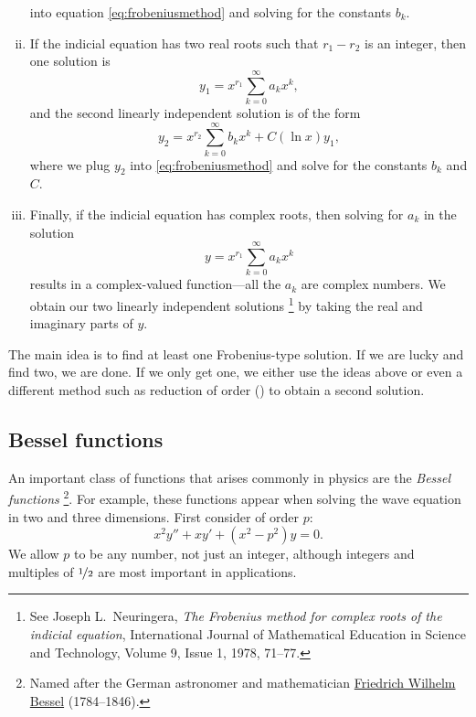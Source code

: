 \begin{enumerate}[(i)]
\begin{equation*}
\end{equation*}
into equation \eqref{eq:frobeniusmethod} and solving for the constants $b_k$.
\item
If the indicial equation has two real roots such that $r_1-r_2$ is
an integer, then one solution is
\begin{equation*}
y_1 = x^{r_1} \sum_{k=0}^\infty a_k x^{k} ,
\end{equation*}
and the second linearly independent solution is of the form
\begin{equation*}
y_2 = x^{r_2} \sum_{k=0}^\infty b_k x^{k} + C (\ln x) y_1 ,
\end{equation*}
where we plug $y_2$ into \eqref{eq:frobeniusmethod} and solve for the
constants $b_k$ and $C$.
\item
Finally, if the indicial equation has complex roots, then solving
for $a_k$ in the solution
\begin{equation*}
y = x^{r_1} \sum_{k=0}^\infty a_k x^{k}
\end{equation*}
results in a complex-valued function---all the $a_k$ are complex
numbers.  We obtain our two linearly independent
solutions%
\footnote{See 
Joseph L.\ Neuringera,
\emph{The Frobenius method for complex roots of the indicial equation},
International Journal of Mathematical Education in Science and Technology,
Volume 9, Issue 1, 1978, 71--77.}
by taking the real and imaginary parts of $y$.
\end{enumerate}

The main idea is to find at least one Frobenius-type solution.  If
we are lucky and find two, we are done.
If we only get one, we either use the ideas above or even a different method
such as reduction of order () to
obtain a second solution.

\subsection{Bessel functions} \label{bessel:subsection}

An important class of functions that arises commonly in physics are the
\emph{Bessel functions}%
\footnote{Named after
the German astronomer and mathematician
\href{http://en.wikipedia.org/wiki/Friedrich_Bessel}{Friedrich Wilhelm
Bessel} (1784--1846).}.
For example, these functions appear when solving the
wave equation in two and three dimensions.  First consider
\emph{} of order $p$:
\begin{equation*}
x^2 y'' + xy' + \left(x^2 - p^2\right)y = 0 .
\end{equation*}
We allow $p$ to be any number, not just an integer, although integers
and multiples of $\nicefrac{1}{2}$ are most important in applications.

